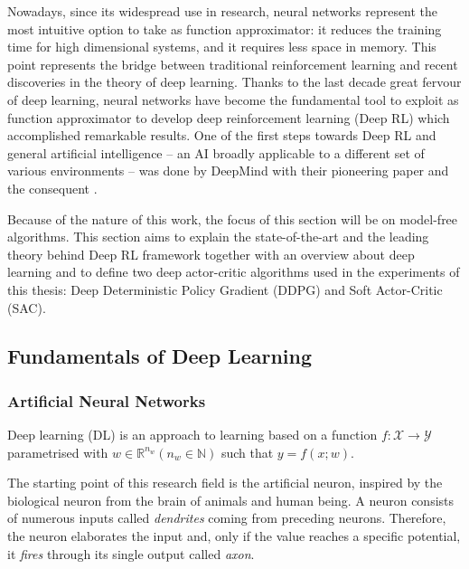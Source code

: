 Nowadays, since its widespread use in research, neural networks represent the most intuitive option to take as function approximator: it reduces the training time for high dimensional systems, and it requires less space in memory.
This point represents the bridge between traditional reinforcement learning and recent discoveries in the theory of deep learning. 
Thanks to the last decade great fervour of deep learning, neural networks have become the fundamental tool to exploit as function approximator to develop deep reinforcement learning (Deep RL) which accomplished remarkable results. One of the first steps towards Deep RL and general artificial intelligence -- an AI broadly applicable to a different set of various environments -- was done by DeepMind with their pioneering paper \cite{mnih2013playing} and the consequent \cite{mnih2015human}.

Because of the nature of this work, the focus of this section will be on model-free algorithms.
This section aims to explain the state-of-the-art and the leading theory behind Deep RL framework together with an overview about deep learning and to define two deep actor-critic algorithms used in the experiments of this thesis: Deep Deterministic Policy Gradient (DDPG) and Soft Actor-Critic (SAC).

\subsection{Fundamentals of Deep Learning}

\subsubsection{Artificial Neural Networks}
Deep learning (DL) is an approach to learning based on a function $f: \mathcal{X} \rightarrow \mathcal{Y}$ parametrised with $w \in \mathbb{R}^{n_w} (n_w \in \mathbb{N})$ such that $y = f(x;w)$.

The starting point of this research field is the artificial neuron, inspired by the biological neuron from the brain of animals and human being. A neuron consists of numerous inputs called \textit{dendrites} coming from preceding neurons. Therefore, the neuron elaborates the input and, only if the value reaches a specific potential, it \textit{fires} through its single output called \textit{axon}.

